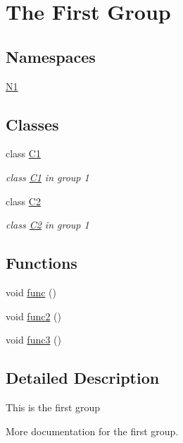 \hypertarget{group__group1}{\section{The First Group}
\label{group__group1}
}
\subsection*{Namespaces}
\begin{DoxyCompactItemize}
\item 
\hyperlink{namespaceN1}{N1}
\end{DoxyCompactItemize}
\subsection*{Classes}
\begin{DoxyCompactItemize}
\item 
class \hyperlink{classC1}{C1}
\begin{DoxyCompactList}\small\item\em class \hyperlink{classC1}{C1} in group 1 \end{DoxyCompactList}\item 
class \hyperlink{classC2}{C2}
\begin{DoxyCompactList}\small\item\em class \hyperlink{classC2}{C2} in group 1 \end{DoxyCompactList}\end{DoxyCompactItemize}
\subsection*{Functions}
\begin{DoxyCompactItemize}
\item 
void \hyperlink{group__group1_ga24f647174760cac13d2624b5ad74b00c}{func} ()
\item 
void \hyperlink{group__group1_ga053929c0809a5f56f7548fd7d9968f31}{func2} ()
\item 
void \hyperlink{group__group1_gadbf675591ff057ec48ce35b0d5cdf755}{func3} ()
\end{DoxyCompactItemize}


\subsection{Detailed Description}
This is the first group

More documentation for the first group. 

